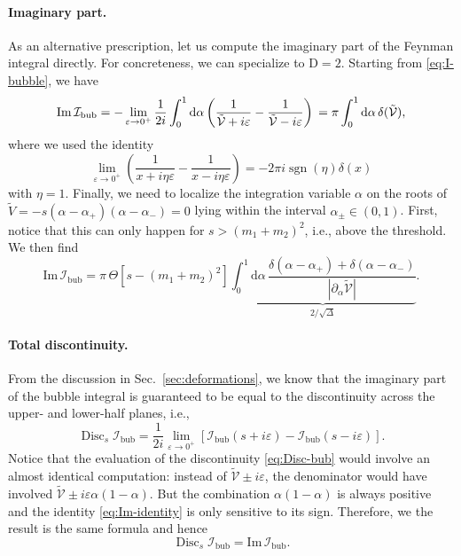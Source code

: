 \documentclass[12pt]{article}
\numberwithin{figure}{section}
\DeclareMathOperator{\sgn}{sgn}
\DeclareMathOperator{\Disc}{Disc}
\def \be {\begin{equation}}
\def \ee {\end{equation}}
\def \D {\mathrm{D}}
\def \d {\mathrm{d}}
\def \eps {\varepsilon}
\def \V {\mathcal{V}}
\def \I {\mathcal{I}}
\def \Im {\mathrm{Im}}
\def \bubble {\mathrm{bub}}
\begin{document}
	\paragraph{Imaginary part.}
	As an alternative prescription, let us compute the imaginary part of the Feynman integral directly.
	For concreteness, we can specialize to $\D=2$. Starting from \eqref{eq:I-bubble}, we have
	\be
	\Im\, \I_{\bubble} = 
	-\lim_{\eps \to 0^+} \frac{1}{2i} \int_{0}^{1} \d \alpha \left( \frac{1}{\tilde{\V}+i\eps} - \frac{1}{\tilde{\V}-i\eps} \right)\\
	= \pi \int_{0}^{1} \d\alpha\, \delta(\tilde{\V}),
	\ee
	where we used the identity
	\be\label{eq:Im-identity}
	\lim_{\eps \to 0^+} \left( \frac{1}{x+i\eta\eps} - \frac{1}{x-i\eta\eps} \right) = -2\pi i \sgn(\eta)\delta(x)
	\ee
	with $\eta = 1$. Finally, we need to localize the integration variable $\alpha$ on the roots of $\tilde{V} = -s (\alpha - \alpha_+)(\alpha - \alpha_-) = 0$ lying within the interval $\alpha_{\pm} \in (0,1)$. First, notice that this can only happen for $s > (m_1 + m_2)^2$, i.e., above the threshold. We then find
	\be\label{eq:Im-bub2}
	\Im\, \I_{\bubble} = \pi \, \Theta[s - (m_1{+}m_2)^2] \underbrace{\int_{0}^{1} \d\alpha\, \frac{\delta(\alpha - \alpha_+) + \delta(\alpha - \alpha_-)}{|\partial_{\alpha}\tilde{\V}|}}_{2/\sqrt{\Delta}}.
	\ee
	
	\paragraph{Total discontinuity.}
	
	From the discussion in Sec.~\ref{sec:deformations}, we know that the imaginary part of the bubble integral is guaranteed to be equal to the discontinuity across the upper- and lower-half planes, i.e.,
	\be\label{eq:Disc-bub}
	\Disc_{s} \I_{\bubble} = \frac{1}{2i} \lim_{\eps \to 0^+}\left[\I_{\bubble}(s+i\eps) - \I_{\bubble}(s-i\eps) \right].
	\ee
	Notice that the evaluation of the discontinuity \eqref{eq:Disc-bub} would involve an almost identical computation: instead of $\tilde{\V} \pm i\eps$, the denominator would have involved $\tilde{\V} \pm i\eps \alpha(1-\alpha)$. But the combination $\alpha(1-\alpha)$ is always positive and the identity \eqref{eq:Im-identity} is only sensitive to its sign. Therefore, we the result is the same formula and hence
	\be
	\Disc_s \I_{\bubble} = \Im\, \I_{\bubble}.
	\ee
	
\end{document}
